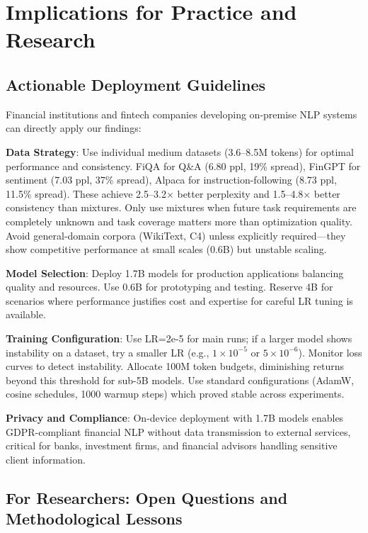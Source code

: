 \section{Implications for Practice and Research}

\subsection{Actionable Deployment Guidelines}

Financial institutions and fintech companies developing on-premise NLP systems can directly apply our findings:

\textbf{Data Strategy}: Use individual medium datasets (3.6–8.5M tokens) for optimal performance and consistency. FiQA for Q\&A (6.80 ppl, 19\% spread), FinGPT for sentiment (7.03 ppl, 37\% spread), Alpaca for instruction-following (8.73 ppl, 11.5\% spread). These achieve 2.5–3.2$\times$ better perplexity and 1.5–4.8$\times$ better consistency than mixtures. Only use mixtures when future task requirements are completely unknown and task coverage matters more than optimization quality. Avoid general-domain corpora (WikiText, C4) unless explicitly required—they show competitive performance at small scales (0.6B) but unstable scaling.

\textbf{Model Selection}: Deploy 1.7B models for production applications balancing quality and resources. Use 0.6B for prototyping and testing. Reserve 4B for scenarios where performance justifies cost and expertise for careful LR tuning is available.

\textbf{Training Configuration}: Use LR=2e-5 for main runs; if a larger model shows instability on a dataset, try a smaller LR (e.g., $1\times10^{-5}$ or $5\times10^{-6}$). Monitor loss curves to detect instability. Allocate 100M token budgets, diminishing returns beyond this threshold for sub-5B models. Use standard configurations (AdamW, cosine schedules, 1000 warmup steps) which proved stable across experiments.

\textbf{Privacy and Compliance}: On-device deployment with 1.7B models enables GDPR-compliant financial NLP without data transmission to external services, critical for banks, investment firms, and financial advisors handling sensitive client information.

\subsection{For Researchers: Open Questions and Methodological Lessons}

